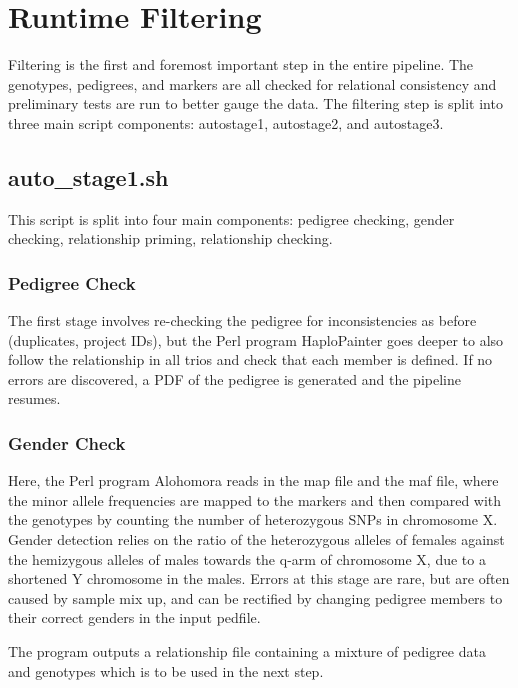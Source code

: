 \section{Runtime Filtering}

Filtering is the first and foremost important step in the entire pipeline. The genotypes, pedigrees, and markers are all checked for relational consistency and preliminary tests are run to better gauge the data. The filtering step is split into three main script components: \gls{autostage1}, \gls{autostage2}, and \gls{autostage3}.

\subsection{auto\_stage1.sh}

This script is split into four main components: pedigree checking, gender checking, relationship priming, relationship checking.

\subsubsection{Pedigree Check}

The first stage involves re-checking the pedigree for inconsistencies as before (duplicates, project IDs), but the \gls{Perl} program \gls{HaploPainter} goes deeper to also follow the relationship in all trios and check that each member is defined. If no errors are discovered, a PDF of the pedigree is generated and the pipeline resumes.

\subsubsection{Gender Check}

Here, the Perl program \gls{Alohomora} reads in the map file and the maf file, where the minor allele frequencies are mapped to the markers and then compared with the genotypes by counting the number of heterozygous SNPs in chromosome X. Gender detection relies on the ratio of the heterozygous alleles of females against the hemizygous alleles of males towards the q-arm of chromosome X, due to a shortened Y chromosome in the males. Errors at this stage are rare, but are often caused by sample mix up, and can be rectified by changing pedigree members to their correct genders in the input pedfile.

The program outputs a relationship file containing a mixture of pedigree data and genotypes which is to be used in the next step.

